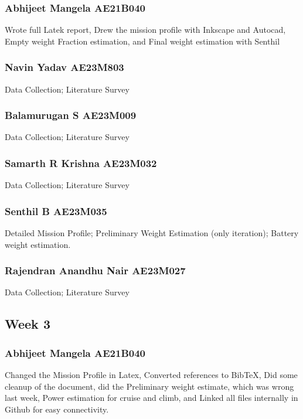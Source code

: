 \documentclass[12 pt]{article}
\begin{document}
{{\subsubsection{Abhijeet Mangela AE21B040}
Wrote full Latek report, Drew the mission profile with Inkscape and Autocad, Empty weight Fraction estimation, and Final weight estimation with Senthil

\subsubsection{Navin Yadav AE23M803}

Data Collection; Literature Survey

\subsubsection{Balamurugan S AE23M009}

Data Collection; Literature Survey

\subsubsection{Samarth R Krishna AE23M032}

Data Collection; Literature Survey

\subsubsection{Senthil B AE23M035}

Detailed Mission Profile; Preliminary Weight Estimation (only iteration); Battery weight estimation.

\subsubsection{Rajendran Anandhu Nair AE23M027}

Data Collection; Literature Survey




\subsection{Week 3}


\subsubsection{Abhijeet Mangela AE21B040}
Changed the Mission Profile in Latex, Converted references to BibTeX, Did some cleanup of the document, did the Preliminary weight estimate, which was wrong last week, Power estimation for cruise and climb, and Linked all files internally in Github for easy connectivity.

}}
\end{document}

